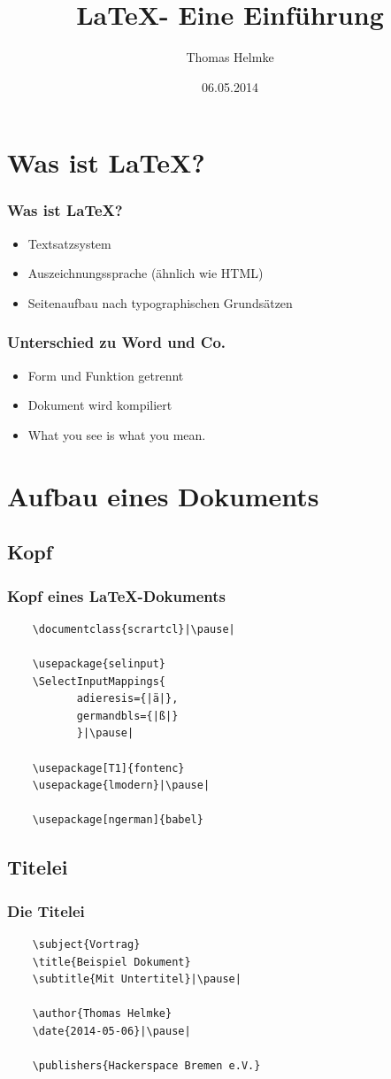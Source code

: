 \documentclass{beamer}
\title[\hshblogo]{\LaTeX - Eine Einführung}
\author{Thomas Helmke}
\date{06.05.2014}
\begin{document}
\maketitle
\frame{\tableofcontents}
 
\section{Was ist \LaTeX?}
\begin{frame}[<+->] %
	\frametitle{Was ist \LaTeX?} %
	\begin{itemize}
		\item Textsatzsystem
		\item Auszeichnungssprache (ähnlich wie HTML)
		\item Seitenaufbau nach typographischen Grundsätzen
	\end{itemize}
\end{frame}
\begin{frame}[<+->] %
	\frametitle{Unterschied zu Word und Co.} %
	\begin{itemize}
		\item Form und Funktion getrennt
		\item Dokument wird kompiliert
		\item What you see is what you mean.
	\end{itemize}
\end{frame}

\setbeamercovered{}
\section{Aufbau eines Dokuments}
\subsection{Kopf}
\begin{frame}[fragile] %
	\frametitle{Kopf eines \LaTeX-Dokuments} %
	\begin{lstlisting}
	\documentclass{scrartcl}|\pause|
	
	\usepackage{selinput}
	\SelectInputMappings{
		   adieresis={|ä|},
		   germandbls={|ß|}
		   }|\pause|
		   
	\usepackage[T1]{fontenc}
	\usepackage{lmodern}|\pause|
	
	\usepackage[ngerman]{babel}
	\end{lstlisting}
\end{frame}
\subsection{Titelei}
\begin{frame}[fragile] %
	\frametitle{Die Titelei} %
	\begin{lstlisting}
	\subject{Vortrag}
	\title{Beispiel Dokument}
	\subtitle{Mit Untertitel}|\pause|
	
	\author{Thomas Helmke}
	\date{2014-05-06}|\pause|
	
	\publishers{Hackerspace Bremen e.V.}
	\end{lstlisting}
\end{frame}
\end{document}
